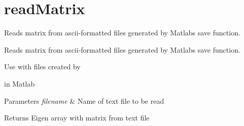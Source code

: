 \hypertarget{group__readMatrix}{}\section{read\+Matrix}
\label{group__readMatrix}


Reads matrix from ascii-\/formatted files generated by Matlab\textquotesingle{}s \textquotesingle{}save\textquotesingle{} function.  


Reads matrix from ascii-\/formatted files generated by Matlab\textquotesingle{}s \textquotesingle{}save\textquotesingle{} function. 

Use with files created by 
\begin{DoxyCode}{0}
\end{DoxyCode}
 in Matlab


\begin{DoxyParams}{Parameters}
{\em filename} & Name of text file to be read \\
\hline
\end{DoxyParams}
\begin{DoxyReturn}{Returns}
Eigen array with matrix from text file 
\end{DoxyReturn}
